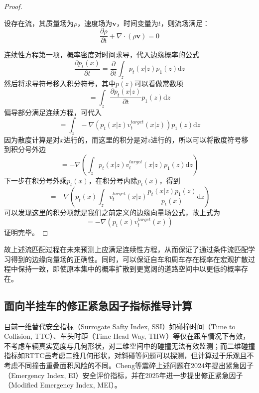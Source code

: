     \begin{proof}
      \begin{theorem}[连续性方程]
        设存在流，其质量场为$\rho$，速度场为$\mathbf{v}$，时间变量为$t$，则流场满足：
        \begin{equation}
          \frac{\partial \rho}{\partial t} + \nabla \cdot (\rho \mathbf{v}) = 0
        \end{equation}
      \end{theorem}
      连续性方程第一项，概率密度对时间求导，代入边缘概率的公式
      \begin{equation}\frac{\partial p_t(x)}{\partial t} = \frac{\partial}{\partial t}\int_z p_t(x|z)p_1(z)\mathrm{d}z\end{equation}
      然后将求导符号移入积分符号，其中$p(z)$可以看做常数项
      \begin{equation}= \int_z \frac{\partial p_t(x|z)}{\partial t}p_1(z)\mathrm{d}z\end{equation}
      偏导部分满足连续方程，可代入
      \begin{equation}= \int_z -\nabla \left(p_t(x|z) v_t^{target}(x|z)\right)p_1(z)\mathrm{d}z\end{equation}
      因为散度计算是对$x$进行的，而这里的积分是对$z$进行的，所以可以将散度符号移到积分号外边
      \begin{equation}= -\nabla \left(\int_z p_t(x|z) v_t^{target}(x|z)p_1(z)\mathrm{d}z\right)\end{equation}
      下一步在积分号外乘$p_t(x)$，在积分号内除$p_t(x)$，得到
      \begin{equation}= -\nabla \left(p_t(x)\int_z  v_t^{target}(x|z)\frac{p_t(x|z)p_1(z)}{p_t(x)}\mathrm{d}z\right)\end{equation}
      可以发现这里的积分项就是我们之前定义的边缘向量场公式，故上式为
      \begin{equation} = -\nabla \left(p_t(x) v_t^{target}(x)\right)\end{equation}
      证明完毕。
  \end{proof}
  故上述流匹配过程在未来预测上应满足连续性方程，从而保证了通过条件流匹配学习得到的边缘向量场的正确性。同时，可以保证自车和周车存在概率在宏观扩散过程中保持一致，即使原本集中的概率扩散到更宽阔的道路空间中以更低的概率存在。

  \subsection{面向半挂车的修正紧急因子指标推导计算}
  \label{sub:trailer_mei_proof}
    目前一维替代安全指标（Surrogate Safty Index, SSI）如碰撞时间（Time to Collision, TTC）、车头时距（Time Head Way, THW）等仅在跟车情况下有效，不考虑车辆真实宽度与几何形状，对二维空间中的碰撞无法有效监测；而二维碰撞指标如RTTC虽考虑二维几何形状，对斜碰等问题可以探测，但计算过于乐观且不考虑不同撞击重叠面积风险的不同。Cheng等震碎上述问题在2024年提出紧急因子（Emergency Index, EI）\cite{chenghao2025emergency_index}安全评价指标，并在2025年进一步提出修正紧急因子（Modified Emergency Index, MEI）\cite{chenhao2025mei}。

